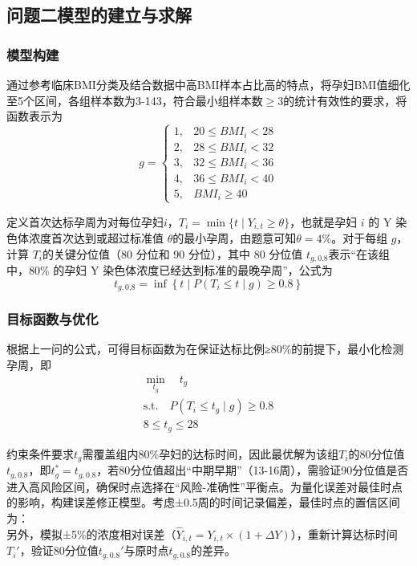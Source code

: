 \documentclass[withoutpreface,bwprint]{cumcmthesis} %
\begin{document}

\subsection{问题二模型的建立与求解}

\subsubsection{模型构建} 
通过参考临床BMI分类及结合数据中高BMI样本占比高的特点，将孕妇BMI值细化至5个区间，各组样本数为3-143，符合最小组样本数$\ge$3的统计有效性的要求，将函数表示为
\begin{equation}
    g = \begin{cases} 
1, & 20 \leq BMI_i < 28 \\
2, & 28 \leq BMI_i < 32 \\
3, & 32 \leq BMI_i < 36 \\
4, & 36 \leq BMI_i < 40 \\
5, & BMI_i \geq 40 
\end{cases}
\end{equation}

定义首次达标孕周为对每位孕妇$i$，$T_i = \min\{t \mid Y_{i,t}≥\theta\}$，也就是孕妇 $i$ 的 Y 染色体浓度首次达到或超过标准值 $\theta$的最小孕周，由题意可知$\theta = 4$\%。对于每组 $g$，计算 $T_i$的关键分位值（80 分位和 90 分位），其中 80 分位值 $t_{g,0.8}$表示“在该组中，80\% 的孕妇 Y 染色体浓度已经达到标准的最晚孕周”，公式为
\begin{equation}
    t_{g,0.8} = \inf\left\{ t \mid P(T_i \leq t \mid g) \geq 0.8 \right\}
\end{equation}

\subsubsection{目标函数与优化}
根据上一问的公式，可得目标函数为在保证达标比例≥80\%的前提下，最小化检测孕周，即  
\begin{align}
\min_{t_g} \quad t_g \\
\text{s.t.} \quad P(T_i \leq t_g \mid g) \geq 0.8 \\
8 \leq t_g \leq 28
\end{align}



约束条件要求$t_g$需覆盖组内80\%孕妇的达标时间，因此最优解为该组$T_i$的80分位值$t_{g,0.8}$，即$t_g^* = t_{g,0.8}$，若80分位值超出“中期早期”（13-16周），需验证90分位值是否进入高风险区间，确保时点选择在“风险-准确性”平衡点。为量化误差对最佳时点的影响，构建误差修正模型。考虑±0.5周的时间记录偏差，最佳时点的置信区间为：  
\begin{equation}
[t_g^* - \Delta t, t_g^* + \Delta t]
\end{equation}
另外，模拟±5\%的浓度相对误差（$\hat{Y}_{i,t} = Y_{i,t} \times (1+\Delta Y)$），重新计算达标时间$T_i'$，验证80分位值$t_{g,0.8}'$与原时点$t_{g,0.8}$的差异。  
\end{document}
